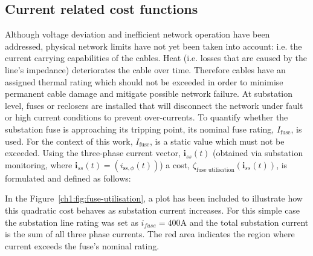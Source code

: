 

\subsection{Current related cost functions}
\label{ch1:subsec:currents-related-cost-functions}


Although voltage deviation and inefficient network operation have been addressed, physical network limits have not yet been taken into account: i.e. the current carrying capabilities of the cables.
Heat (i.e. losses that are caused by the line's impedance) deteriorates the cable over time.
Therefore cables have an assigned thermal rating which should not be exceeded in order to minimise permanent cable damage and mitigate possible network failure.
At substation level, fuses or reclosers are installed that will disconnect the network under fault or high current conditions to prevent over-currents.
To quantify whether the substation fuse is approaching its tripping point, its nominal fuse rating, $I_\text{fuse}$, is used.
For the context of this work, $I_\text{fuse}$, is a static value which must not be exceeded.
Using the three-phase current vector, $\textbf{i}_{ss}(t)$ (obtained via substation monitoring, where $\textbf{i}_{ss}(t) = (i_{\text{ss},\phi}(t))$) a cost, $\zeta_\text{fuse utilisation}(\textbf{i}_{ss}(t))$, is formulated and defined as follows:



In the Figure~\ref{ch1:fig:fuse-utilisation}, a plot has been included to illustrate how this quadratic cost behaves as substation current increases.
For this simple case the substation line rating was set as $i_{fuse}=400\text{A}$ and the total substation current is the sum of all three phase currents.
The red area indicates the region where current exceeds the fuse's nominal rating.


